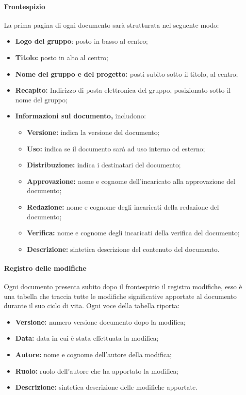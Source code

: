 \paragraph{Frontespizio}    
La prima pagina di ogni documento sarà strutturata nel seguente modo:
\begin{itemize}
	\item \textbf{Logo del gruppo}: posto in basso al centro;
	\item \textbf{Titolo:} posto in alto al centro;
	\item \textbf{Nome del gruppo e del progetto:} posti subito sotto il titolo, al centro;
	\item \textbf{Recapito:} Indirizzo di posta elettronica del gruppo, posizionato sotto il nome del gruppo;
	\item \textbf{Informazioni sul documento,} includono:
	\begin{itemize}
		\item \textbf{Versione:} indica la versione del documento;
		\item \textbf{Uso:} indica se il documento sarà ad uso interno od esterno;
		\item \textbf{Distribuzione:} indica i destinatari del documento;
		\item \textbf{Approvazione:} nome e cognome dell'incaricato alla approvazione del documento;
		\item \textbf{Redazione:} nome e cognome degli incaricati della redazione del documento;
		\item \textbf{Verifica:} nome e cognome degli incaricati della verifica del documento;
		\item \textbf{Descrizione:} sintetica descrizione del contenuto del documento.
	\end{itemize}
\end{itemize}
\paragraph{Registro delle modifiche}      
Ogni documento presenta subito dopo il frontespizio il registro modifiche, esso è una tabella che traccia tutte le modifiche significative apportate al documento durante il suo ciclo di vita. Ogni voce della tabella riporta:
\begin{itemize}
	\item \textbf{Versione:} numero versione documento dopo la modifica;
	\item \textbf{Data:} data in cui è stata effettuata la modifica;
	\item \textbf{Autore:} nome e cognome dell'autore della modifica;
	\item \textbf{Ruolo:} ruolo dell'autore che ha apportato la modifica;
	\item \textbf{Descrizione:} sintetica descrizione delle modifiche apportate.
\end{itemize}
